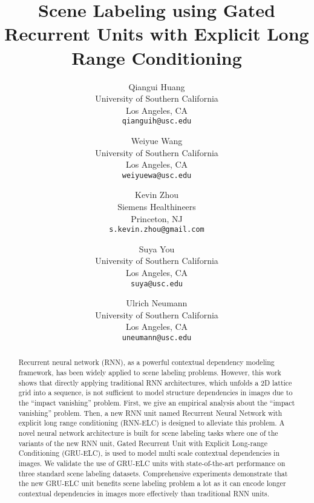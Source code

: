 \documentclass[10pt,twocolumn,letterpaper]{article}
\begin{document}
\title{Scene Labeling using Gated Recurrent Units with Explicit Long Range Conditioning}


\author{Qiangui Huang\\
University of Southern California\\
Los Angeles, CA\\
{\tt\small qianguih@usc.edu}
\and
Weiyue Wang\\
University of Southern California\\
Los Angeles, CA\\
{\tt\small weiyuewa@usc.edu}
\and
Kevin Zhou\\
Siemens Healthineers\\
Princeton, NJ\\
{\tt\small s.kevin.zhou@gmail.com}
\and
Suya You\\
University of Southern California\\
Los Angeles, CA\\
{\tt\small suya@usc.edu}
\and
Ulrich Neumann\\
University of Southern California\\
Los Angeles, CA\\
{\tt\small uneumann@usc.edu}
}

\maketitle


\begin{abstract}
   Recurrent neural network (RNN), as a powerful contextual dependency modeling framework, has been widely applied to scene labeling problems. However, this work shows that directly applying traditional RNN architectures, which unfolds a 2D lattice grid into a sequence, is not sufficient to model structure dependencies in images due to the ``impact vanishing'' problem. First, we give an empirical analysis about the ``impact vanishing'' problem. Then, a new RNN unit named Recurrent Neural Network with explicit long range conditioning (RNN-ELC) is designed to alleviate this problem. A novel neural network architecture is built for scene labeling tasks where one of the variants of the new RNN unit, Gated Recurrent Unit with Explicit Long-range Conditioning (GRU-ELC), is used to model multi scale contextual dependencies in images. We validate the use of GRU-ELC units with state-of-the-art performance on three standard scene labeling datasets. Comprehensive experiments demonstrate that the new GRU-ELC unit benefits scene labeling problem a lot as it can encode longer contextual dependencies in images more effectively than traditional RNN units.
   
   
   
\end{abstract}
\end{document}
